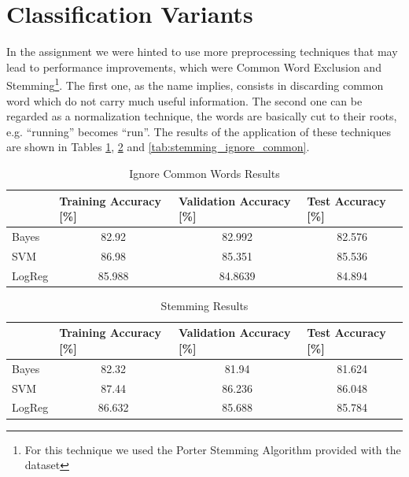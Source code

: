 \documentclass[10pt,a4paper]{report}
\begin{document}
\section{Classification Variants}
In the assignment we were hinted to use more preprocessing techniques that may lead to performance improvements, which were Common Word Exclusion and Stemming\footnote{For this technique we used the Porter Stemming Algorithm provided with the dataset}. The first one, as the name implies, consists in discarding common word which do not carry much useful information. The second one can be regarded as a normalization technique, the words are basically cut to their roots, e.g. \enquote{running} becomes \enquote{run}. The results of the application of these techniques are shown in Tables \ref{tab:ignore_common}, \ref{tab:stemming} and \ref{tab:stemming_ignore_common}.
\begin{table}[!ht]
\centering
\begin{tabular}{|l|c|c|c|}
\hline
 & \multicolumn{1}{l|}{Training Accuracy {[}\%{]}} & \multicolumn{1}{l|}{Validation Accuracy {[}\%{]}} & \multicolumn{1}{l|}{Test Accuracy {[}\%{]}} \\ \hline
Bayes  & 82.92  & 82.992  & 82.576 \\ \hline
SVM    & 86.98  & 85.351  & 85.536 \\ \hline
LogReg & 85.988 & 84.8639 & 84.894 \\ \hline
\end{tabular}
\caption{Ignore Common Words Results}
\label{tab:ignore_common}
\end{table} 

\begin{table}[!ht]
\centering
\begin{tabular}{|l|c|c|c|}
\hline
 & \multicolumn{1}{l|}{Training Accuracy {[}\%{]}} & \multicolumn{1}{l|}{Validation Accuracy {[}\%{]}} & \multicolumn{1}{l|}{Test Accuracy {[}\%{]}} \\ \hline
Bayes  & 82.32  & 81.94  & 81.624 \\ \hline
SVM    & 87.44  & 86.236 & 86.048 \\ \hline
LogReg & 86.632 & 85.688 & 85.784 \\ \hline
\end{tabular}
\caption{Stemming Results}
\label{tab:stemming}
\end{table} 
\end{document}
